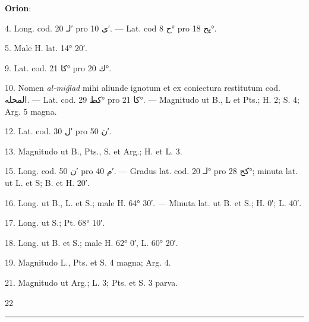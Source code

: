 \documentclass[11pt]{article}
\begin{document}
{\small
\par\hspace*{8mm}\textbf{Orion}:
\par\hangindent=12mm 4. Long. cod. \textarabic{لـ} 20′ pro \textarabic{ى} 10′. — Lat. cod \textarabic{ح} 8° pro \textarabic{يح} 18°.
\par\hangindent=12mm 5. Male H. lat. 14° 20′.
\par\hangindent=12mm 9. Lat. cod. \textarabic{كا} 21° pro \textarabic{ك} 20°.
\par\hangindent=12mm 10. Nomen \textit{al-miǵlad} mihi aliunde ignotum et ex coniectura restitutum cod. \textarabic{المحله}. — Lat. cod. \textarabic{كط} 29° pro \textarabic{كا} 21°. — Magnitudo ut B., L et Pts.; H. 2; S. 4; Arg. 5 magna.
\par\hangindent=12mm 12. Lat. cod. \textarabic{ل} 30′ pro \textarabic{ن} 50′.
\par\hangindent=12mm 13. Magnitudo ut B., Pts., S. et Arg.; H. et L. 3.
\par\hangindent=12mm 15. Long. cod. \textarabic{ن} 50′ pro \textarabic{م} 40′. — Gradus lat. cod. \textarabic{لـ} 20° pro \textarabic{كح} 28°; minuta lat. ut L. et S; B. et H. 20′.
\par\hangindent=12mm 16. Long. ut B., L. et S.; male H. 64° 30′. — Minuta lat. ut B. et S.; H. 0′; L. 40′.
\par\hangindent=12mm 17. Long. ut S.; Pt. 68° 10′.
\par\hangindent=12mm 18. Long. ut B. et S.; male H. 62° 0′, L. 60° 20′.
\par\hangindent=12mm 19. Magnitudo L., Pts. et S. 4 magna; Arg. 4.
\par\hangindent=12mm 21. Magnitudo ut Arg.; L. 3; Pts. et S. 3 parva.
\par}
\par\vfill\hfill 22
\clearpage
\noindent{}\par\vspace{-1mm}\noindent\rule{\textwidth}{.4pt}\par\vspace{2mm}
\end{document}
